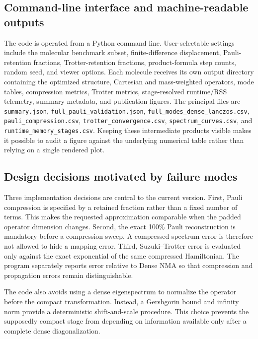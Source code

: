 \documentclass[aip,jcp,reprint,amsmath,amssymb,floatfix]{revtex4-2}
\begin{document}
\subsection{Command-line interface and machine-readable outputs}
The code is operated from a Python command line. User-selectable settings include the molecular benchmark subset, finite-difference displacement, Pauli-retention fractions, Trotter-retention fractions, product-formula step counts, random seed, and viewer options. Each molecule receives its own output directory containing the optimized structure, Cartesian and mass-weighted operators, mode tables, compression metrics, Trotter metrics, stage-resolved runtime/RSS telemetry, summary metadata, and publication figures. The principal files are \texttt{summary.json}, \texttt{full\_pauli\_validation.json}, \texttt{full\_modes\_dense\_lanczos.csv}, \texttt{pauli\_compression.csv}, \texttt{trotter\_convergence.csv}, \texttt{spectrum\_curves.csv}, and \texttt{runtime\_memory\_stages.csv}. Keeping these intermediate products visible makes it possible to audit a figure against the underlying numerical table rather than relying on a single rendered plot.

\subsection{Design decisions motivated by failure modes}
Three implementation decisions are central to the current version. First, Pauli compression is specified by a retained fraction rather than a fixed number of terms. This makes the requested approximation comparable when the padded operator dimension changes. Second, the exact 100\% Pauli reconstruction is mandatory before a compression sweep. A compressed-spectrum error is therefore not allowed to hide a mapping error. Third, Suzuki--Trotter error is evaluated only against the exact exponential of the same compressed Hamiltonian. The program separately reports error relative to Dense NMA so that compression and propagation errors remain distinguishable.

The code also avoids using a dense eigenspectrum to normalize the operator before the compact transformation. Instead, a Gershgorin bound and infinity norm provide a deterministic shift-and-scale procedure. This choice prevents the supposedly compact stage from depending on information available only after a complete dense diagonalization.
\end{document}
